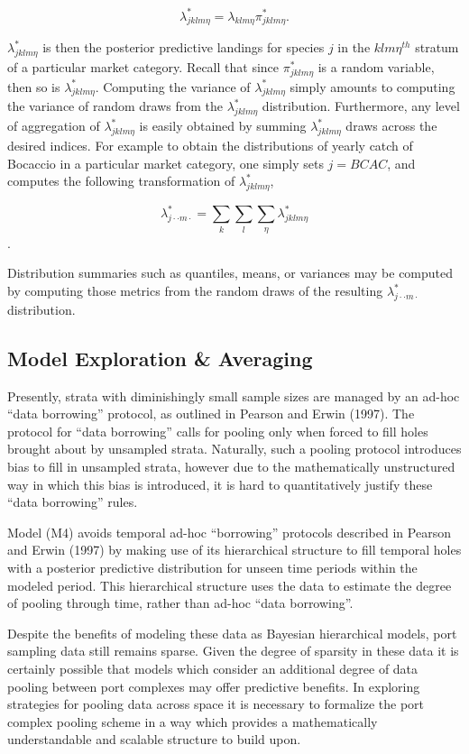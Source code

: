 \documentclass[12pt]{article}
\begin{document}
\[\lambda^*_{jklm\eta} = \lambda_{klm\eta}\pi^*_{jklm\eta}.\]

\(\lambda^*_{jklm\eta}\) is then the posterior predictive landings for
species \(j\) in the \(klm\eta^{th}\) stratum of a particular market
category. Recall that since \(\pi^*_{jklm\eta}\) is a random variable,
then so is \(\lambda^*_{jklm\eta}\). Computing the variance of
\(\lambda^*_{jklm\eta}\) simply amounts to computing the variance of
random draws from the \(\lambda^*_{jklm\eta}\) distribution.
Furthermore, any level of aggregation of \(\lambda^*_{jklm\eta}\) is
easily obtained by summing \(\lambda^*_{jklm\eta}\) draws across the
desired indices. For example to obtain the distributions of yearly catch
of Bocaccio in a particular market category, one simply sets \(j=BCAC\),
and computes the following transformation of \(\lambda^*_{jklm\eta}\),

\[\lambda^*_{j\cdot\cdot m\cdot} =\sum_{k}\sum_{l}\sum_{\eta}\lambda^*_{jklm\eta}\].

Distribution summaries such as quantiles, means, or variances may be
computed by computing those metrics from the random draws of the
resulting \(\lambda^*_{j\cdot\cdot m\cdot}\) distribution.

\subsection{Model Exploration \&
Averaging}\label{model-exploration-averaging}

Presently, strata with diminishingly small sample sizes are managed by
an ad-hoc ``data borrowing'' protocol, as outlined in Pearson and Erwin
(1997). The protocol for ``data borrowing'' calls for pooling only when
forced to fill holes brought about by unsampled strata. Naturally, such
a pooling protocol introduces bias to fill in unsampled strata, however
due to the mathematically unstructured way in which this bias is
introduced, it is hard to quantitatively justify these ``data
borrowing'' rules.

Model (M4) avoids temporal ad-hoc ``borrowing'' protocols described in
Pearson and Erwin (1997) by making use of its hierarchical structure to
fill temporal holes with a posterior predictive distribution for unseen
time periods within the modeled period. This hierarchical structure uses
the data to estimate the degree of pooling through time, rather than
ad-hoc ``data borrowing''.

Despite the benefits of modeling these data as Bayesian hierarchical
models, port sampling data still remains sparse. Given the degree of
sparsity in these data it is certainly possible that models which
consider an additional degree of data pooling between port complexes may
offer predictive benefits. In exploring strategies for pooling data
across space it is necessary to formalize the port complex pooling
scheme in a way which provides a mathematically understandable and
scalable structure to build upon.
\end{document}
